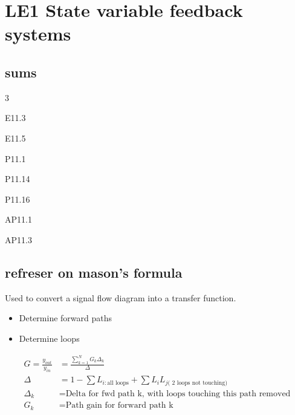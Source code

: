 \documentclass{report}
\begin{document}
\chapter{LE1 State variable feedback systems}
	\section{sums}
\begin{itemize}
	
\end{itemize}
	\section{refreser on mason's formula}
	\label{sec:refreser on mason's formula}
	Used to convert a signal flow diagram into a transfer function. 
	\begin{itemize}
		\item Determine forward paths
		\item Determine loops
	\end{itemize}
	\begin{align*}
		\label{eq:}
		G = \frac{y_{out}}{y_{in}} &= \frac{\sum^{N}_{k=1}G_k\Delta_k}{\Delta} \\
		\Delta &= 1 - \sum L_{i: \text{all loops}} + \sum L_{i}L_{j \text{( 2 loops not touching)}}\\
		\Delta_k &= \text{Delta for fwd path k, with loops touching this path removed}\\
		G_k &= \text{Path gain for forward path k}\
	\end{align*}
\end{document}
